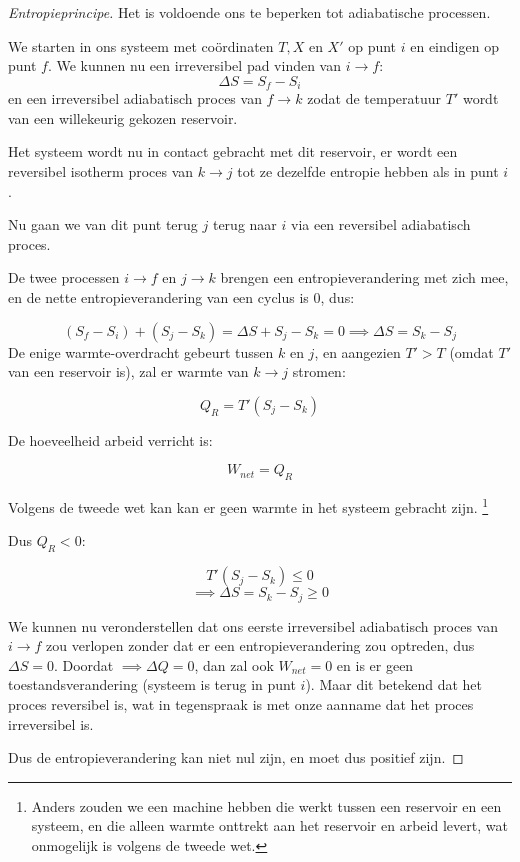\begin{proof}[Entropieprincipe]
    Het is voldoende ons te beperken tot adiabatische processen.

    We starten in ons systeem met coördinaten \(T, X\) en \(X'\) op punt \(i\) en eindigen op punt \(f\). 
    We kunnen nu een irreversibel pad vinden van \(i \to f\): 
    \[
    \Delta S = S_f - S_i 
    \]
    en een irreversibel adiabatisch proces van \(f \to k\) zodat de temperatuur \(T'\) wordt van een willekeurig gekozen reservoir.

    Het systeem wordt nu in contact gebracht met dit reservoir, er wordt een reversibel isotherm proces van \(k \to j\) tot ze dezelfde entropie hebben als in punt \(i\).

    Nu gaan we van dit punt terug \(j\) terug naar \(i\) via een reversibel adiabatisch proces.

    De twee processen \(i \to f\) en \(j \to k\) brengen een entropieverandering met zich mee, en de nette entropieverandering van een cyclus is \(0\), dus:

    \[
    (S_f-S_i) + (S_j- S_k) = \Delta S + S_j - S_k = 0
     \implies \Delta S = S_k - S_j
    \]
    De enige warmte-overdracht gebeurt tussen \(k\) en \(j\), en aangezien \(T' > T\) (omdat \(T'\) van een reservoir is), zal er warmte van \(k \to j\) stromen:

    \[
    Q_R = T' (S_j-S_k)
    \]

    De hoeveelheid arbeid verricht is:

    \[
    W_{net} = Q_R
    \]

    Volgens de tweede wet kan kan er geen warmte in het systeem gebracht zijn.
    \footnote{Anders zouden we een machine hebben die werkt tussen een reservoir en een systeem, en die alleen warmte onttrekt aan het reservoir en arbeid levert, wat onmogelijk is volgens de tweede wet.}

    Dus \(Q_R<0\):

    \[
    T'(S_j-S_k) \leq 0 
    \]
    \[
    \implies \Delta S = S_k - S_j \geq 0
    \]

    We kunnen nu veronderstellen dat ons eerste irreversibel adiabatisch proces van \(i \to f\) zou verlopen zonder dat er een entropieverandering zou optreden, dus \(\Delta S = 0\).
    Doordat \(\implies \Delta Q = 0 \), dan zal ook \(W_{net} = 0\) en is er geen toestandsverandering (systeem is terug in punt \(i\)).
    Maar dit betekend dat het proces reversibel is, wat in tegenspraak is met onze aanname dat het proces irreversibel is.

    Dus de entropieverandering kan niet nul zijn, en moet dus positief zijn.
\end{proof}

